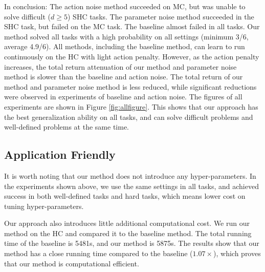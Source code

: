 In conclusion: The action noise method succeeded on MC, but was unable to solve difficult ($d\ge5$) SHC tasks. The parameter noise method succeeded in the SHC task, but failed on the MC task. The baseline almost failed in all tasks. Our method solved all tasks with a high probability on all settings (minimum 3/6, average 4.9/6). All methods, including the baseline method, can learn to run continuously on the HC with light action penalty. However, as the action penalty increases, the total return attenuation of our method and parameter noise method is slower than the baseline and action noise. The total return of our method and parameter noise method is less reduced, while significant reductions were observed in experiments of baseline and action noise. The figures of all experiments are shown in Figure \ref{fig:allfigure}. This shows that our approach has the best generalization ability on all tasks, and can solve difficult problems and well-defined problems at the same time.

\subsection{Application Friendly}
It is worth noting that our method does not introduce any hyper-parameters. In the experiments shown above, we use the same settings in all tasks, and achieved success in both well-defined tasks and hard tasks, which means lower cost on tuning hyper-parameters.
   
 Our approach also introduces little additional computational cost. We run our method on the HC and compared it to the baseline method. The total running time of the baseline is 5481s, and our method is 5875s. The results show that our method has a close running time compared to the baseline ($1.07\times$), which proves that our method is computational efficient.